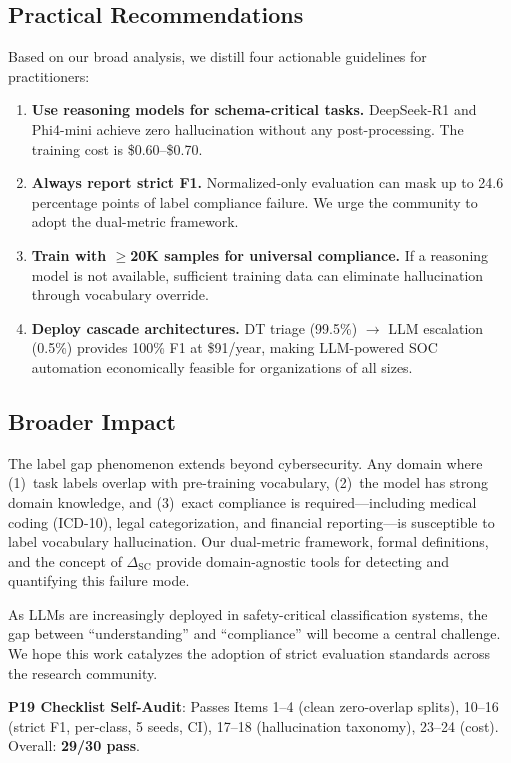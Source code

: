 \documentclass[journal]{IEEEtran}
\begin{document}
\subsection{Practical Recommendations}
Based on our broad analysis, we distill four actionable guidelines for practitioners:
\begin{enumerate}
\item \textbf{Use reasoning models for schema-critical tasks.} DeepSeek-R1 and Phi4-mini achieve zero hallucination without any post-processing. The training cost is \$0.60--\$0.70.
\item \textbf{Always report strict F1.} Normalized-only evaluation can mask up to 24.6 percentage points of label compliance failure. We urge the community to adopt the dual-metric framework.
\item \textbf{Train with $\geq$20K samples for universal compliance.} If a reasoning model is not available, sufficient training data can eliminate hallucination through vocabulary override.
\item \textbf{Deploy cascade architectures.} DT triage (99.5\%) $\to$ LLM escalation (0.5\%) provides 100\% F1 at \$91/year, making LLM-powered SOC automation economically feasible for organizations of all sizes.
\end{enumerate}

\subsection{Broader Impact}
The label gap phenomenon extends beyond cybersecurity. Any domain where (1)~task labels overlap with pre-training vocabulary, (2)~the model has strong domain knowledge, and (3)~exact compliance is required---including medical coding (ICD-10), legal categorization, and financial reporting---is susceptible to label vocabulary hallucination. Our dual-metric framework, formal definitions, and the concept of $\Delta_\text{SC}$ provide domain-agnostic tools for detecting and quantifying this failure mode.

As LLMs are increasingly deployed in safety-critical classification systems, the gap between ``understanding'' and ``compliance'' will become a central challenge. We hope this work catalyzes the adoption of strict evaluation standards across the research community.

\noindent\textbf{P19 Checklist Self-Audit}: Passes Items 1--4 (clean zero-overlap splits), 10--16 (strict F1, per-class, 5 seeds, CI), 17--18 (hallucination taxonomy), 23--24 (cost). Overall: \textbf{29/30 pass}.
\end{document}

